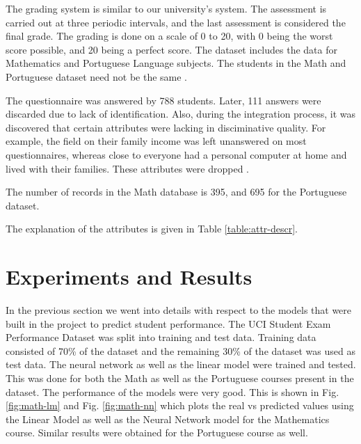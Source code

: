\documentclass[conference]{IEEEtran}
\begin{document}
The grading system is similar to our university's system. The assessment is carried out at three 
periodic intervals, and the last assessment is considered the final grade. The grading is done on a scale 
of 0 to 20, with 0 being the worst score possible, and 20 being a perfect score. The dataset includes 
the data for Mathematics and Portuguese Language subjects. The students in the Math and Portuguese dataset 
need not be the same \cite{ref:4}.

The questionnaire was answered by 788 students. Later, 111 answers were discarded due to lack of identification. 
Also, during the integration process, it was discovered that certain attributes were lacking in disciminative 
quality. For example, the field on their family income was left unanswered on most questionnaires, whereas close 
to everyone had a personal computer at home and lived with their families. These attributes were dropped \cite{ref:4}.

The number of records in the Math database is 395, and 695 for the Portuguese dataset.

The explanation of the attributes is given in Table \ref{table:attr-descr}.
	\section{Experiments and Results} \label{expts-reslts}

In the previous section we went into details with respect to the models that were built in the project to predict student performance. The UCI Student Exam Performance Dataset was split into training and test data. Training data consisted of 70\% of the dataset and the remaining 30\% of the dataset was used as test data. The neural network as well as the linear model were trained and tested. This was done for both the Math as well as the Portuguese courses present in the dataset. The performance of the models were very good. This is shown in Fig. \ref{fig:math-lm} and Fig. \ref{fig:math-nn} which plots the real vs predicted values using the Linear Model as well as the Neural Network model for the Mathematics course. Similar results were obtained for the Portuguese course as well.
\end{document}
